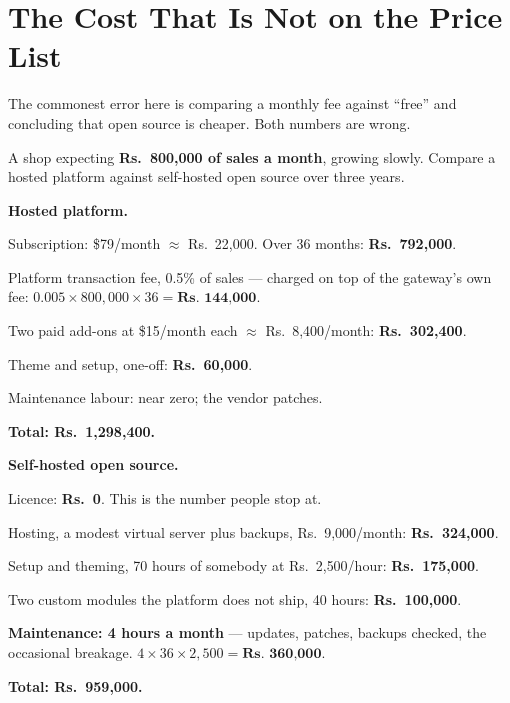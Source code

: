 \section{The Cost That Is Not on the Price List}

The commonest error here is comparing a monthly fee against ``free'' and
concluding that open source is cheaper. Both numbers are wrong.

\begin{worked}
A shop expecting \textbf{Rs.~800{,}000 of sales a month}, growing slowly.
Compare a hosted platform against self-hosted open source over three years.

\smallskip
\textbf{Hosted platform.}

\begin{tight}
  \item Subscription: \$79/month $\approx$ Rs.~22{,}000. Over 36 months:
        \textbf{Rs.~792{,}000}.
  \item Platform transaction fee, 0.5\% of sales --- charged on top of the
        gateway's own fee: $0.005 \times 800{,}000 \times 36 =
        \textbf{Rs.~144{,}000}$.
  \item Two paid add-ons at \$15/month each $\approx$ Rs.~8{,}400/month:
        \textbf{Rs.~302{,}400}.
  \item Theme and setup, one-off: \textbf{Rs.~60{,}000}.
  \item Maintenance labour: near zero; the vendor patches.
  \item \textbf{Total: Rs.~1{,}298{,}400.}
\end{tight}

\smallskip
\textbf{Self-hosted open source.}

\begin{tight}
  \item Licence: \textbf{Rs.~0}. This is the number people stop at.
  \item Hosting, a modest virtual server plus backups, Rs.~9{,}000/month:
        \textbf{Rs.~324{,}000}.
  \item Setup and theming, 70 hours of somebody at Rs.~2{,}500/hour:
        \textbf{Rs.~175{,}000}.
  \item Two custom modules the platform does not ship, 40 hours:
        \textbf{Rs.~100{,}000}.
  \item \textbf{Maintenance: 4 hours a month} --- updates, patches, backups
        checked, the occasional breakage. $4 \times 36 \times 2{,}500 =
        \textbf{Rs.~360{,}000}$.
  \item \textbf{Total: Rs.~959{,}000.}
\end{tight}


\end{worked}
